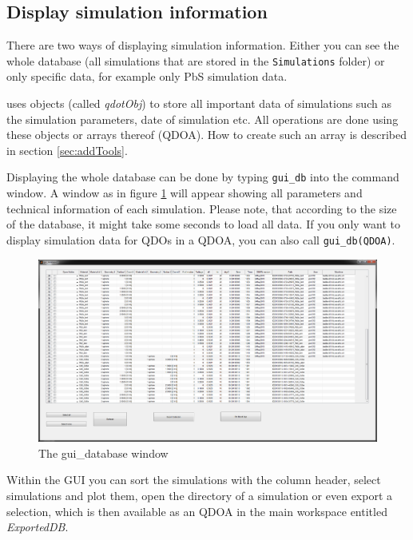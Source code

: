 		\subsection{Display simulation information} \label{sec:guiDB}
			There are two ways of displaying simulation information. Either you can see the whole database  (all simulations
			that are stored in the \lstinline{Simulations} folder) or only specific data, for example only PbS simulation data.
			
			\begin{REMARK}
				\software uses objects (called {\it qdotObj}) to store all important data of simulations such as the simulation parameters, date of simulation etc.
				All operations are done using these objects or arrays thereof (QDOA). How to create such an array is described in section \ref{sec:addTools}.
			\end{REMARK}
			
			Displaying the whole database can be done by typing \lstinline{gui_db}  into the \matlab command window. A window as in figure
			\ref{fig:gui_database} will appear showing all parameters and technical information of each simulation. Please note, that according to the size
			of the database, it might take some seconds to load all data.
			If you only want to display simulation data for QDOs in a QDOA, you can also call \lstinline{gui_db(QDOA)}.
			
			\begin{figure}[htbp]
				\centering
				\includegraphics[width=\textwidth]{Fig/Scrn_gui_database.png}
				\caption{The gui\_database window}
				\label{fig:gui_database}
			\end{figure}
						
			Within the \gls{GUI} you can sort the simulations with the column header, select simulations and plot them, open the directory of a simulation or 
			even export a selection, which is then available as an \gls{QDOA} in the main workspace entitled {\it ExportedDB}.

